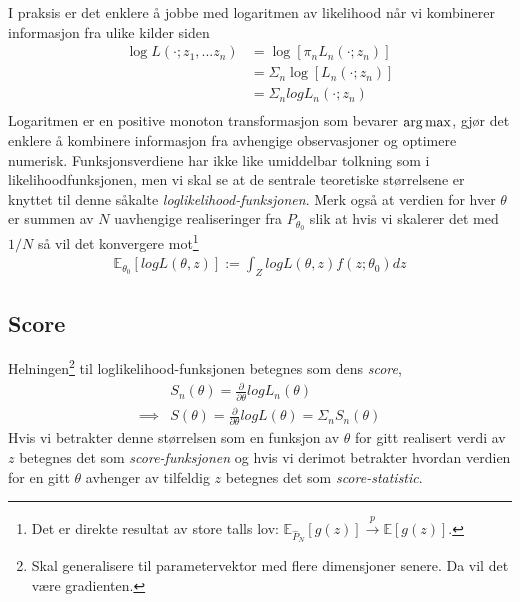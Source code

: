 I praksis er det enklere å jobbe med logaritmen av likelihood når vi kombinerer informasjon fra ulike kilder siden
\begin{align}
\log L(\cdot;z_1,...z_n) &= \log [ \pi_n L_n(\cdot;z_n)] \\
&= \Sigma_n \log [L_n(\cdot;z_n)] \\
&= \Sigma_n logL_n(\cdot;z_n) \\
\end{align}
Logaritmen er en positive monoton transformasjon som bevarer $\operatorname*{arg\,max}$, gjør det enklere å kombinere informasjon fra avhengige observasjoner og optimere numerisk. Funksjonsverdiene har ikke like umiddelbar tolkning som i likelihoodfunksjonen, men vi skal se at de sentrale teoretiske størrelsene er knyttet til denne såkalte \textit{loglikelihood-funksjonen}. Merk også at verdien for hver $\theta$ er summen av $N$ uavhengige realiseringer fra $P_{\theta_0}$ slik at hvis vi skalerer det med $1/N$ så vil det konvergere mot\footnote{Det er direkte resultat av store talls lov: $\mathbb{E}_{\hat{P}_N}[g(z)] \overset{p}{\to} \mathbb{E}[g(z)]$.}
\begin{align}
\mathbb{E}_{\theta_0}[logL(\theta,z)]:=\int_Z logL(\theta,z) f(z;\theta_0)dz
\end{align}
\subsection{Score}
Helningen\footnote{Skal generalisere til parametervektor med flere dimensjoner senere. Da vil det være gradienten.} til loglikelihood-funksjonen betegnes som dens \textit{score},
\begin{align}
&S_n(\theta) = \frac{\partial}{\partial \theta} logL_n(\theta) \\
\implies & S(\theta) = \frac{\partial}{\partial \theta} logL(\theta) = \Sigma_n S_n(\theta)
\end{align}
Hvis vi betrakter denne størrelsen som en funksjon av $\theta$ for gitt realisert verdi av $z$ betegnes det som \textit{score-funksjonen} og hvis vi derimot betrakter hvordan verdien for en gitt $\theta$ avhenger av tilfeldig $z$ betegnes det som \textit{score-statistic}.

